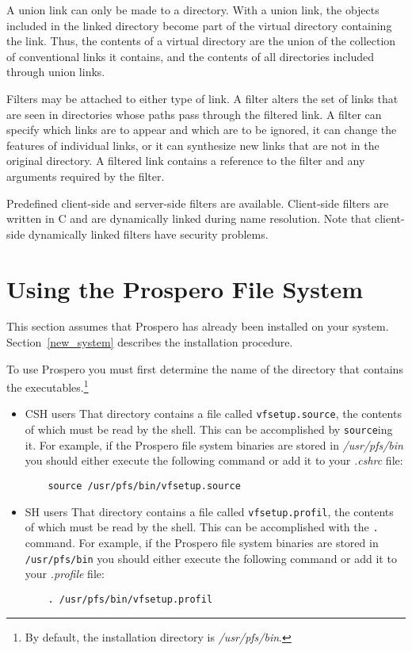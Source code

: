 A union link can only be made to a directory.  With a union link, the
objects included in the linked directory become part of the virtual
directory containing the link.  Thus, the contents of a virtual
directory are the union of the collection of conventional links it
contains, and the contents of all directories included through union
links.

Filters may be attached to either type of link.  A filter alters the
set of links that are seen in directories whose paths pass through the
filtered link.  A filter can specify which links are to appear and
which are to be ignored, it can change the features of individual
links, or it can synthesize new links that are not in the original
directory.  A filtered link contains a reference to the filter and any
arguments required by the filter.

Predefined client-side and server-side filters are available.
Client-side filters are written in C and are dynamically linked during
name resolution.  Note that client-side dynamically linked filters
have security problems.

\section{Using the Prospero File System}

This section assumes that Prospero has already been installed on your
system.  Section~\ref{new_system} describes the installation
procedure.

To use Prospero you must first determine the name of the directory
that contains the executables.\footnote{By default, the installation
directory is {\it /usr/pfs/bin}.} 
\begin{itemize}
\item{CSH users}  That directory
contains a file called {\tt vfsetup.source}, the contents of which must be
read by the shell.  This can be accomplished by {\tt source}ing it.
For example, if the Prospero file system binaries are stored in {\it
/usr/pfs/bin} you should either execute the following command or add
it to your {\it .cshrc} file:

\begin{verbatim}
    source /usr/pfs/bin/vfsetup.source
\end{verbatim}

\item{SH users}  That directory
contains a file called {\tt vfsetup.profil}, the contents of which must be
read by the shell.  This can be accomplished with the {\tt .} command.
For example, if the Prospero file system binaries are stored in {\tt
/usr/pfs/bin} you should either execute the following command or add
it to your {\it .profile} file:

\begin{verbatim}
    . /usr/pfs/bin/vfsetup.profil
\end{verbatim}

\end{itemize}

